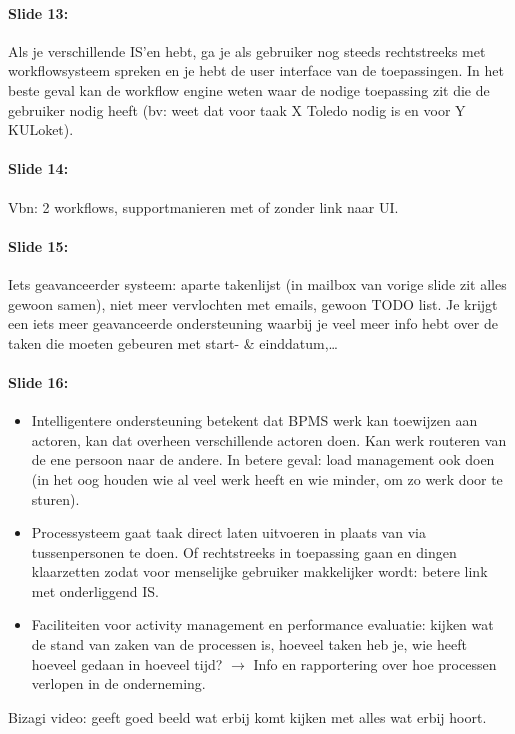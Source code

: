 \documentclass[10pt,a4paper]{report}
\begin{document}
\paragraph{Slide 13:}Als je verschillende IS'en hebt, ga je als gebruiker nog steeds rechtstreeks met workflowsysteem spreken en je hebt de user interface van de toepassingen. In het beste geval kan de workflow engine weten waar de nodige toepassing zit die de gebruiker nodig heeft (bv: weet dat voor taak X Toledo nodig is en voor Y KULoket).

\paragraph{Slide 14:}Vbn: 2 workflows, supportmanieren met of zonder link naar UI.

\paragraph{Slide 15:}Iets geavanceerder systeem: aparte takenlijst (in mailbox van vorige slide zit alles gewoon samen), niet meer vervlochten met emails, gewoon TODO list. Je krijgt een iets meer geavanceerde ondersteuning waarbij je veel meer info hebt over de taken die moeten gebeuren met start- \& einddatum,…

\paragraph{Slide 16:}
\begin{itemize}
\item Intelligentere ondersteuning betekent dat BPMS werk kan toewijzen aan actoren, kan dat overheen verschillende actoren doen. Kan werk routeren van de ene persoon naar de andere. In betere geval: load management ook doen (in het oog houden wie al veel werk heeft en wie minder, om zo werk door te sturen).
\item Processysteem gaat taak direct laten uitvoeren in plaats van via tussenpersonen te doen. Of rechtstreeks in toepassing gaan en dingen klaarzetten zodat voor menselijke gebruiker makkelijker wordt: betere link met onderliggend IS.
\item Faciliteiten voor activity management en performance evaluatie: kijken wat de stand van zaken van de processen is, hoeveel taken heb je, wie heeft hoeveel gedaan in hoeveel tijd? $\rightarrow$ Info en rapportering over hoe processen verlopen in de onderneming.
\end{itemize}
Bizagi video: geeft goed beeld wat erbij komt kijken met alles wat erbij hoort.
\end{document}
